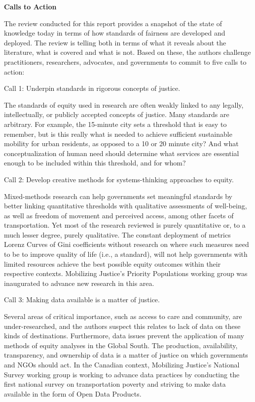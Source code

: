 \documentclass[12pt, oneside]{report}
\begin{document}
\textbf{Calls to Action}

The review conducted for this report provides a snapshot of the state of
knowledge today in terms of how standards of fairness are developed and
deployed. The review is telling both in terms of what it reveals about
the literature, what is covered and what is not. Based on these, the
authors challenge practitioners, researchers, advocates, and governments
to commit to five calls to action:

Call 1: Underpin standards in rigorous concepts of justice.

The standards of equity used in research are often weakly linked to any
legally, intellectually, or publicly accepted concepts of justice. Many
standards are arbitrary. For example, the 15-minute city sets a
threshold that is easy to remember, but is this really what is needed to
achieve sufficient sustainable mobility for urban residents, as opposed
to a 10 or 20 minute city? And what conceptualization of human need
should determine what services are essential enough to be included
within this threshold, and for whom?

Call 2: Develop creative methods for systems-thinking approaches to
equity.

Mixed-methods research can help governments set meaningful standards by
better linking quantitative thresholds with qualitative assessments of
well-being, as well as freedom of movement and perceived access, among
other facets of transportation. Yet most of the research reviewed is
purely quantitative or, to a much lesser degree, purely qualitative. The
constant deployment of metrics Lorenz Curves of Gini coefficients
without research on where such measures need to be to improve quality of
life (i.e., a standard), will not help governments with limited
resources achieve the best possible equity outcomes within their
respective contexts. Mobilizing Justice's Priority Populations working
group was inaugurated to advance new research in this area.

Call 3: Making data available is a matter of justice.

Several areas of critical importance, such as access to care and
community, are under-researched, and the authors suspect this relates to
lack of data on these kinds of destinations. Furthermore, data issues
prevent the application of many methods of equity analyses in the Global
South. The production, availability, transparency, and ownership of data
is a matter of justice on which governments and NGOs should act. In the
Canadian context, Mobilizing Justice's National Survey working group is
working to advance data practices by conducting the first national
survey on transportation poverty and striving to make data available in
the form of Open Data Products.
\end{document}
